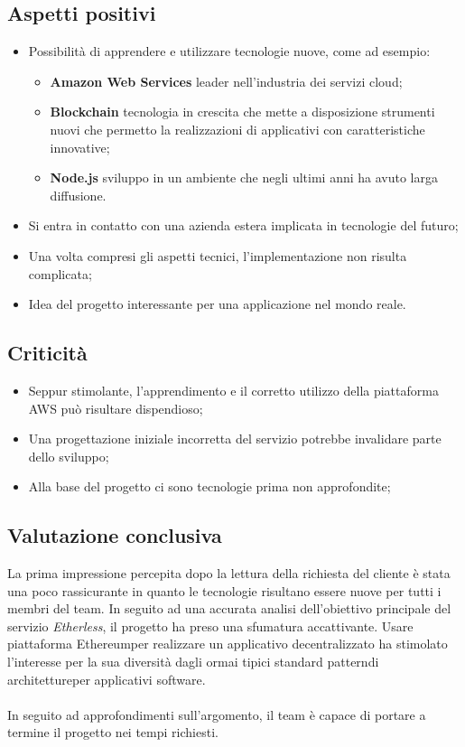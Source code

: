 \subsection{Aspetti positivi}
\begin{itemize}
	\item Possibilità di apprendere e utilizzare tecnologie nuove, come ad esempio:
		\begin{itemize}
			\item \textbf{Amazon Web Services} leader nell'industria dei servizi cloud;
			\item \textbf{Blockchain\glo} tecnologia in crescita che mette a disposizione strumenti nuovi che permetto la realizzazioni di applicativi con caratteristiche innovative;
			\item \textbf{Node.js} sviluppo in un ambiente che negli ultimi anni ha avuto larga diffusione.
		\end{itemize}
	\item Si entra in contatto con una azienda estera implicata in tecnologie del futuro;
	\item Una volta compresi gli aspetti tecnici, l'implementazione non risulta complicata;
	\item Idea del progetto interessante per una applicazione nel mondo reale.
\end{itemize}

\subsection{Criticità}
\begin{itemize}
	\item Seppur stimolante, l'apprendimento e il corretto utilizzo della piattaforma AWS può risultare dispendioso;
	\item Una progettazione iniziale incorretta del servizio potrebbe invalidare parte dello sviluppo;
	\item Alla base del progetto ci sono tecnologie prima non approfondite;
\end{itemize}

\subsection{Valutazione conclusiva}
La prima impressione percepita dopo la lettura della richiesta del cliente è stata una poco rassicurante in quanto le tecnologie risultano essere nuove per tutti i membri del team. In seguito ad una accurata analisi dell'obiettivo principale del servizio \textit{Etherless}, il progetto ha preso una sfumatura accattivante. Usare piattaforma Ethereum\glo per realizzare un applicativo decentralizzato ha stimolato l'interesse per la sua diversità dagli ormai tipici standard pattern\glo di architetture\glo per applicativi software.
\\\\
In seguito ad approfondimenti sull'argomento, il team è capace di portare a termine il progetto nei tempi richiesti.